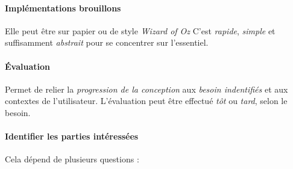 \documentclass{report}
\begin{document}
\begin{multicols*}{3}
    \paragraph{Implémentations brouillons}
    Elle peut être sur papier ou de style \textit{Wizard of Oz}  
    C'est \textit{rapide}, \textit{simple} et suffisamment 
    \textit{abstrait} pour se concentrer sur l'essentiel.   


    \paragraph{Évaluation}
    Permet de relier la \textit{progression de la conception} aux 
    \textit{besoin indentifiés} et aux contextes de l'utilisateur. 
    L'évaluation peut être effectué \textit{tôt} ou \textit{tard}, 
    selon le besoin. 
    \columnbreak


    \paragraph{Identifier les parties intéressées}
    Cela dépend de plusieurs questions :





    
    

    \end{multicols*}




 
\end{document}
